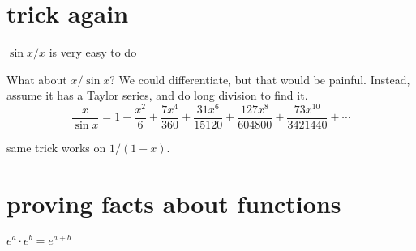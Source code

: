 \documentclass[12pt]{article}
\begin{document}
\section{trick again}

$\sin x / x$ is very easy to do

What about $x / \sin x$?  We could differentiate, but that would be painful.  Instead, assume it has a Taylor series, and do long division to find it.
$$ \frac{x}{\sin x} = 1+\frac{x^2}{6}+\frac{7 x^4}{360}+\frac{31 x^6}{15120}+\frac{127
    x^8}{604800}+\frac{73 x^{10}}{3421440}+\cdots$$

same trick works on $1/(1-x)$.

\section{proving facts about functions}

$e^a \cdot e^b = e^{a+b}$
\end{document}
